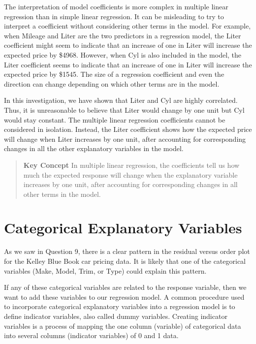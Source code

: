 \documentclass[
]{report}
\begin{document}
The interpretation of model coefficients is more complex in multiple linear regression than in simple linear regression. It can be misleading to try to interpret a coefficient without considering other terms in the model. For example, when Mileage and Liter are the two predictors in a regression model, the Liter coefficient might seem to indicate that an increase of one in Liter will increase the expected price by \$4968. However, when Cyl is also included in the model, the Liter coefficient seems to indicate that an increase of one in Liter will increase the expected price by \$1545. The size of a regression coefficient and even the direction can change depending on which other terms are in the model.

In this investigation, we have shown that Liter and Cyl are highly correlated. Thus, it is unreasonable to believe that Liter would change by one unit but Cyl would stay constant. The multiple linear regression coefficients cannot be considered in isolation. Instead, the Liter coefficient shows how the expected price will change when Liter increases by one unit, after accounting for corresponding changes in all the other
explanatory variables in the model.

\begin{quote}
\textbf{Key Concept}
In multiple linear regression, the coefficients tell us how much the expected response will change when the explanatory variable increases by one unit, after accounting for corresponding changes in all other terms in the model.
\end{quote}

\section{\texorpdfstring{\textbf{Categorical Explanatory Variables}}{Categorical Explanatory Variables}}\label{categorical-explanatory-variables}

As we saw in Question 9, there is a clear pattern in the residual versus order plot for the Kelley Blue Book car pricing data. It is likely that one of the categorical variables (Make, Model, Trim, or Type) could explain this pattern.

If any of these categorical variables are related to the response variable, then we want to add these variables to our regression model. A common procedure used to incorporate categorical explanatory variables into a regression model is to define indicator variables, also called dummy variables. Creating indicator variables is a process of mapping the one column (variable) of categorical data into several columns (indicator variables) of 0 and 1 data.
\end{document}
